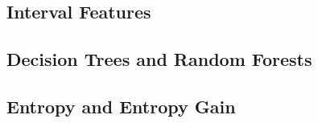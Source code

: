 \subsection{Interval Features}

\subsection{Decision Trees and Random Forests}

\subsection{Entropy and Entropy Gain}

